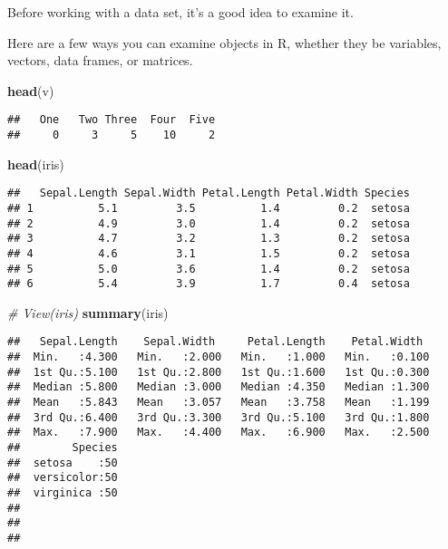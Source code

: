 \documentclass[]{article}
\newenvironment{Shaded}{\begin{snugshade}}{\end{snugshade}}
\newcommand{\KeywordTok}[1]{\textcolor[rgb]{0.13,0.29,0.53}{\textbf{#1}}}
\newcommand{\CommentTok}[1]{\textcolor[rgb]{0.56,0.35,0.01}{\textit{#1}}}
\newcommand{\NormalTok}[1]{#1}
\begin{document}
Before working with a data set, it's a good idea to examine it.

Here are a few ways you can examine objects in R, whether they be
variables, vectors, data frames, or matrices.

\begin{Shaded}
\begin{Highlighting}[]
\KeywordTok{head}\NormalTok{(v)}
\end{Highlighting}
\end{Shaded}

\begin{verbatim}
##   One   Two Three  Four  Five 
##     0     3     5    10     2
\end{verbatim}

\begin{Shaded}
\begin{Highlighting}[]
\KeywordTok{head}\NormalTok{(iris)}
\end{Highlighting}
\end{Shaded}

\begin{verbatim}
##   Sepal.Length Sepal.Width Petal.Length Petal.Width Species
## 1          5.1         3.5          1.4         0.2  setosa
## 2          4.9         3.0          1.4         0.2  setosa
## 3          4.7         3.2          1.3         0.2  setosa
## 4          4.6         3.1          1.5         0.2  setosa
## 5          5.0         3.6          1.4         0.2  setosa
## 6          5.4         3.9          1.7         0.4  setosa
\end{verbatim}

\begin{Shaded}
\begin{Highlighting}[]
\CommentTok{# View(iris)}
\KeywordTok{summary}\NormalTok{(iris)}
\end{Highlighting}
\end{Shaded}

\begin{verbatim}
##   Sepal.Length    Sepal.Width     Petal.Length    Petal.Width   
##  Min.   :4.300   Min.   :2.000   Min.   :1.000   Min.   :0.100  
##  1st Qu.:5.100   1st Qu.:2.800   1st Qu.:1.600   1st Qu.:0.300  
##  Median :5.800   Median :3.000   Median :4.350   Median :1.300  
##  Mean   :5.843   Mean   :3.057   Mean   :3.758   Mean   :1.199  
##  3rd Qu.:6.400   3rd Qu.:3.300   3rd Qu.:5.100   3rd Qu.:1.800  
##  Max.   :7.900   Max.   :4.400   Max.   :6.900   Max.   :2.500  
##        Species  
##  setosa    :50  
##  versicolor:50  
##  virginica :50  
##                 
##                 
## 
\end{verbatim}
\end{document}
